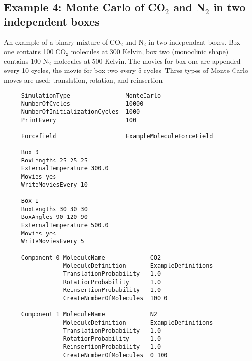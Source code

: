\subsection*{Example 4: Monte Carlo of CO$_2$ and N$_2$ in two independent boxes}
An example of a binary mixture of CO$_2$ and N$_2$ in two independent boxes. Box one contains 100 CO$_2$ molecules
at 300 Kelvin, box two (monoclinic shape) contains 100 N$_2$ molecules at 500 Kelvin. The movies for box one are appended
every 10 cycles, the movie for box two every 5 cycles. Three types of Monte Carlo moves are used: translation, rotation, and
reinsertion.

\begin{tiny}
\begin{verbatim}
     SimulationType                MonteCarlo
     NumberOfCycles                10000
     NumberOfInitializationCycles  1000
     PrintEvery                    100

     Forcefield                    ExampleMoleculeForceField

     Box 0
     BoxLengths 25 25 25
     ExternalTemperature 300.0
     Movies yes
     WriteMoviesEvery 10

     Box 1
     BoxLengths 30 30 30
     BoxAngles 90 120 90
     ExternalTemperature 500.0
     Movies yes
     WriteMoviesEvery 5

     Component 0 MoleculeName             CO2
                 MoleculeDefinition       ExampleDefinitions
                 TranslationProbability   1.0
                 RotationProbability      1.0
                 ReinsertionProbability   1.0
                 CreateNumberOfMolecules  100 0

     Component 1 MoleculeName             N2
                 MoleculeDefinition       ExampleDefinitions
                 TranslationProbability   1.0
                 RotationProbability      1.0
                 ReinsertionProbability   1.0
                 CreateNumberOfMolecules  0 100
\end{verbatim}
\end{tiny}


